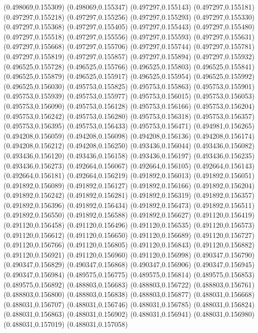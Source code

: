 (0.498069,0.155309)
(0.498069,0.155347)
(0.497297,0.155143)
(0.497297,0.155181)
(0.497297,0.155218)
(0.497297,0.155256)
(0.497297,0.155293)
(0.497297,0.155330)
(0.497297,0.155368)
(0.497297,0.155405)
(0.497297,0.155443)
(0.497297,0.155480)
(0.497297,0.155518)
(0.497297,0.155556)
(0.497297,0.155593)
(0.497297,0.155631)
(0.497297,0.155668)
(0.497297,0.155706)
(0.497297,0.155744)
(0.497297,0.155781)
(0.497297,0.155819)
(0.497297,0.155857)
(0.497297,0.155894)
(0.497297,0.155932)
(0.496525,0.155728)
(0.496525,0.155766)
(0.496525,0.155803)
(0.496525,0.155841)
(0.496525,0.155879)
(0.496525,0.155917)
(0.496525,0.155954)
(0.496525,0.155992)
(0.496525,0.156030)
(0.495753,0.155825)
(0.495753,0.155863)
(0.495753,0.155901)
(0.495753,0.155939)
(0.495753,0.155977)
(0.495753,0.156015)
(0.495753,0.156053)
(0.495753,0.156090)
(0.495753,0.156128)
(0.495753,0.156166)
(0.495753,0.156204)
(0.495753,0.156242)
(0.495753,0.156280)
(0.495753,0.156318)
(0.495753,0.156357)
(0.495753,0.156395)
(0.495753,0.156433)
(0.495753,0.156471)
(0.494981,0.156265)
(0.494208,0.156059)
(0.494208,0.156098)
(0.494208,0.156136)
(0.494208,0.156174)
(0.494208,0.156212)
(0.494208,0.156250)
(0.493436,0.156044)
(0.493436,0.156082)
(0.493436,0.156120)
(0.493436,0.156158)
(0.493436,0.156197)
(0.493436,0.156235)
(0.493436,0.156273)
(0.492664,0.156067)
(0.492664,0.156105)
(0.492664,0.156143)
(0.492664,0.156181)
(0.492664,0.156219)
(0.491892,0.156013)
(0.491892,0.156051)
(0.491892,0.156089)
(0.491892,0.156127)
(0.491892,0.156166)
(0.491892,0.156204)
(0.491892,0.156242)
(0.491892,0.156281)
(0.491892,0.156319)
(0.491892,0.156357)
(0.491892,0.156396)
(0.491892,0.156434)
(0.491892,0.156473)
(0.491892,0.156511)
(0.491892,0.156550)
(0.491892,0.156588)
(0.491892,0.156627)
(0.491120,0.156419)
(0.491120,0.156458)
(0.491120,0.156496)
(0.491120,0.156535)
(0.491120,0.156573)
(0.491120,0.156612)
(0.491120,0.156650)
(0.491120,0.156689)
(0.491120,0.156727)
(0.491120,0.156766)
(0.491120,0.156805)
(0.491120,0.156843)
(0.491120,0.156882)
(0.491120,0.156921)
(0.491120,0.156960)
(0.491120,0.156998)
(0.490347,0.156790)
(0.490347,0.156829)
(0.490347,0.156868)
(0.490347,0.156906)
(0.490347,0.156945)
(0.490347,0.156984)
(0.489575,0.156775)
(0.489575,0.156814)
(0.489575,0.156853)
(0.489575,0.156892)
(0.488803,0.156683)
(0.488803,0.156722)
(0.488803,0.156761)
(0.488803,0.156800)
(0.488803,0.156838)
(0.488803,0.156877)
(0.488031,0.156668)
(0.488031,0.156707)
(0.488031,0.156746)
(0.488031,0.156785)
(0.488031,0.156824)
(0.488031,0.156863)
(0.488031,0.156902)
(0.488031,0.156941)
(0.488031,0.156980)
(0.488031,0.157019)
(0.488031,0.157058)
